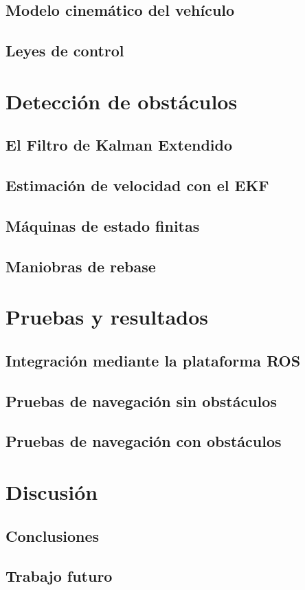 \documentclass{book}
\begin{document}
\section{Modelo cinemático del vehículo}
\section{Leyes de control}

\chapter{Detección de obstáculos}
\section{El Filtro de Kalman Extendido}
\section{Estimación de velocidad con el EKF}
\section{Máquinas de estado finitas}
\section{Maniobras de rebase}

\chapter{Pruebas y resultados}
\section{Integración mediante la plataforma ROS}
\section{Pruebas de navegación sin obstáculos}
\section{Pruebas de navegación con obstáculos}

\chapter{Discusión}
\section{Conclusiones}
\section{Trabajo futuro}
\end{document}
